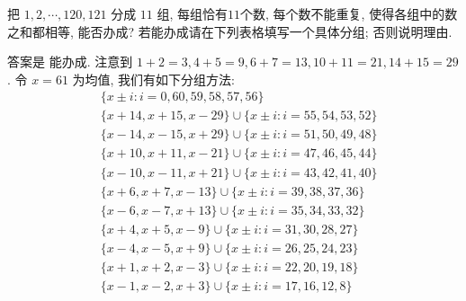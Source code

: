 \begin{prob}
\label{prob:prob-15}
把 $1, 2, \cdots, 120, 121$ 分成 $11$ 组, 每组恰有$11$个数,
每个数不能重复, 使得各组中的数之和都相等, 能否办成?
若能办成请在下列表格填写一个具体分组; 否则说明理由.
\end{prob}

\begin{soln}
答案是 $\boxed{\text{能办成.}}$
注意到 $1 + 2 = 3, 4 + 5 = 9, 6 + 7 = 13,
10 + 11 = 21, 14 + 15 = 29$. 令 $x = 61$ 为均值, 我们有如下分组方法:
\begin{align*}
&\{x \pm i : i = 0, 60, 59, 58, 57, 56\}\\
&\{x + 14, x + 15, x - 29\} \cup \{x \pm i: i = 55, 54, 53, 52\}\\
&\{x - 14, x - 15, x + 29\} \cup \{x \pm i: i = 51, 50, 49, 48\}\\
&\{x + 10, x + 11, x - 21\} \cup \{x \pm i: i = 47, 46, 45, 44\}\\
&\{x - 10, x - 11, x + 21\} \cup \{x \pm i: i = 43, 42, 41, 40\}\\
&\{x + 6,  x + 7,  x - 13\} \cup \{x \pm i: i = 39, 38, 37, 36\}\\
&\{x - 6,  x - 7,  x + 13\} \cup \{x \pm i: i = 35, 34, 33, 32\}\\
&\{x + 4,  x + 5,  x - 9\}  \cup \{x \pm i: i = 31, 30, 28, 27\}\\
&\{x - 4,  x - 5,  x + 9\}  \cup \{x \pm i: i = 26, 25, 24, 23\}\\
&\{x + 1,  x + 2,  x - 3\}  \cup \{x \pm i: i = 22, 20, 19, 18\}\\
&\{x - 1,  x - 2,  x + 3\}  \cup \{x \pm i: i = 17, 16, 12, 8\}
\end{align*}
\end{soln}
